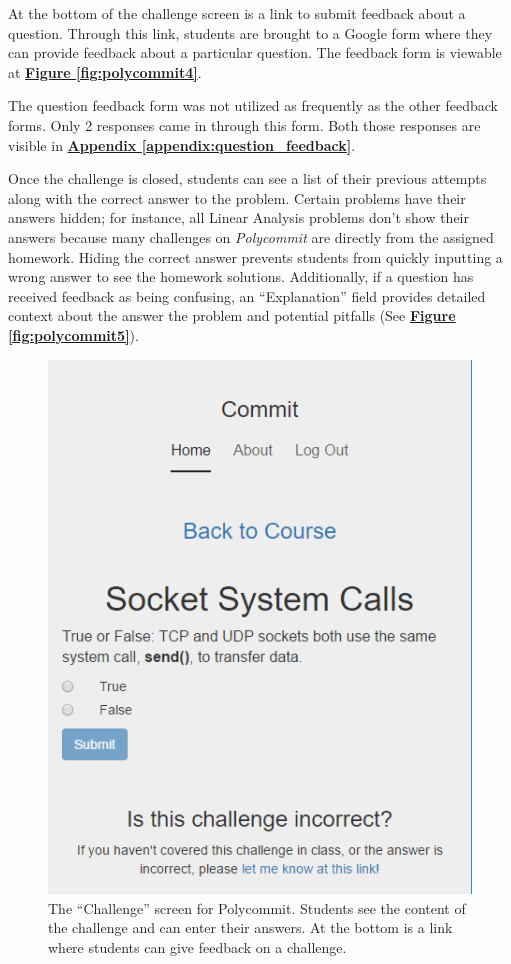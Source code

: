 \par At the bottom of the challenge screen is a link to submit feedback about a question. Through this link, students are brought to a Google form where they can provide feedback about a particular question. The feedback form is viewable at \textbf{\hyperref[fig:polycommit4]{Figure \ref*{fig:polycommit4}}}.

\par The question feedback form was not utilized as frequently as the other feedback forms. Only 2 responses came in through this form. Both those responses are visible in \textbf{\hyperref[appendix:question_feedback]{Appendix \ref*{appendix:question_feedback}}}.

\par Once the challenge is closed, students can see a list of their previous attempts along with the correct answer to the problem. Certain problems have their answers hidden; for instance, all Linear Analysis problems don't show their answers because many challenges on \textit{Polycommit} are directly from the assigned homework. Hiding the correct answer prevents students from quickly inputting a wrong answer to see the homework solutions. Additionally, if a question has received feedback as being confusing, an ``Explanation'' field provides detailed context about the answer the problem and potential pitfalls (See  \textbf{\hyperref[fig:polycommit5]{Figure \ref*{fig:polycommit5}}}).

\begin{figure}
	\includegraphics{figures/pc-question}
	\caption{The ``Challenge'' screen for Polycommit. Students see the content of the challenge and can enter their answers. At the bottom is a link where students can give feedback on a challenge.}
	\label{fig:polycommit3}
\end{figure}


